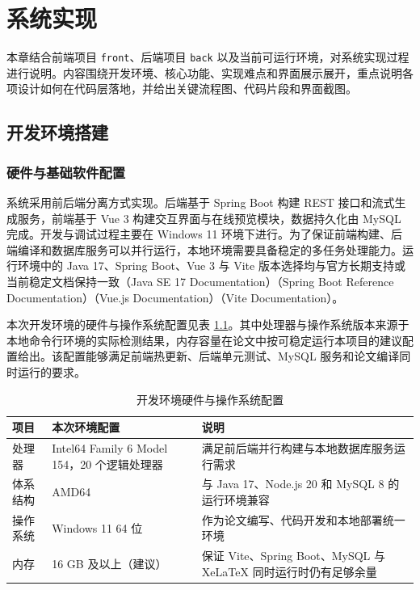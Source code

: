 \chapter{系统实现}

\setlength{\textfloatsep}{10pt plus 2pt minus 2pt}
\setlength{\floatsep}{10pt plus 2pt minus 2pt}
\setlength{\intextsep}{10pt plus 2pt minus 2pt}
\setlength{\abovecaptionskip}{4pt}
\setlength{\belowcaptionskip}{0pt}
\renewcommand{\topfraction}{0.9}
\renewcommand{\bottomfraction}{0.8}
\renewcommand{\textfraction}{0.08}
\renewcommand{\floatpagefraction}{0.8}

本章结合前端项目 \texttt{front}、后端项目 \texttt{back} 以及当前可运行环境，对系统实现过程进行说明。内容围绕开发环境、核心功能、实现难点和界面展示展开，重点说明各项设计如何在代码层落地，并给出关键流程图、代码片段和界面截图。

\section{开发环境搭建}

\subsection{硬件与基础软件配置}
系统采用前后端分离方式实现。后端基于 Spring Boot 构建 REST 接口和流式生成服务，前端基于 Vue 3 构建交互界面与在线预览模块，数据持久化由 MySQL 完成。开发与调试过程主要在 Windows 11 环境下进行。为了保证前端构建、后端编译和数据库服务可以并行运行，本地环境需要具备稳定的多任务处理能力。运行环境中的 Java 17、Spring Boot、Vue 3 与 Vite 版本选择均与官方长期支持或当前稳定文档保持一致（Java SE 17 Documentation）（Spring Boot Reference Documentation）（Vue.js Documentation）（Vite Documentation）\cite{oraclejava17docs2025}\cite{springbootdocs2025}\cite{vuedocs2025}\cite{vitedocs2025}。

本次开发环境的硬件与操作系统配置见表 \ref{tab:chapter5-hardware}。其中处理器与操作系统版本来源于本地命令行环境的实际检测结果，内存容量在论文中按可稳定运行本项目的建议配置给出。该配置能够满足前端热更新、后端单元测试、MySQL 服务和论文编译同时运行的要求。

\begin{table}[!htbp]
\centering
\caption{开发环境硬件与操作系统配置}
\label{tab:chapter5-hardware}
\small
\begin{tabular}{@{}p{}p{}p{}@{}}
\toprule
项目 & 本次环境配置 & 说明 \\
\midrule
处理器 & Intel64 Family 6 Model 154，20 个逻辑处理器 & 满足前后端并行构建与本地数据库服务运行需求 \\
体系结构 & AMD64 & 与 Java 17、Node.js 20 和 MySQL 8 的运行环境兼容 \\
操作系统 & Windows 11 64 位 & 作为论文编写、代码开发和本地部署统一环境 \\
内存 & 16 GB 及以上（建议） & 保证 Vite、Spring Boot、MySQL 与 XeLaTeX 同时运行时仍有足够余量 \\
\bottomrule
\end{tabular}
\end{table}

